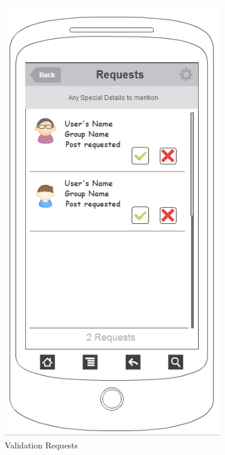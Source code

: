 \documentclass[12pt]{article}
\begin{document}
\begin{figure}[!ht]
\begin{minipage}{.32\textwidth}
        \includegraphics[width=0.85\textwidth]{./appMockUp/validationRequestScreen}
        \caption{Validation Requests}
        \label{fig:validationRequestScreen}
      \end{minipage}

    \end{figure}
    
    
\end{document}
